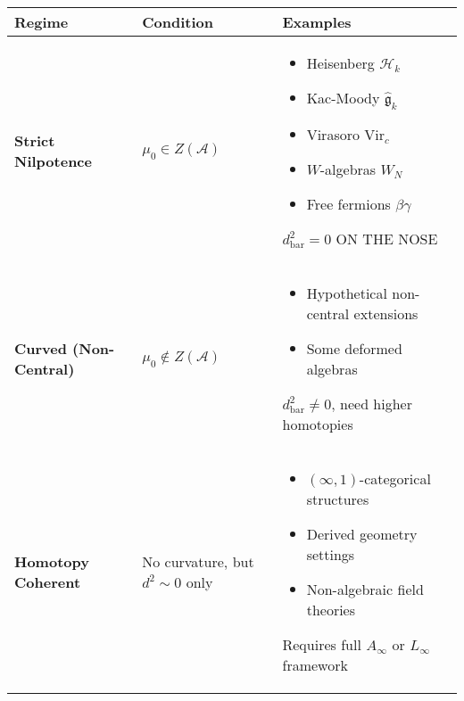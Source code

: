 \begin{center}
\begin{tabular}{|p{3.5cm}|p{4cm}|p{6cm}|}
\hline
\textbf{Regime} & \textbf{Condition} & \textbf{Examples} \\
\hline
\hline
\textbf{Strict Nilpotence} & $\mu_0 \in Z(\mathcal{A})$ & 
\begin{itemize}[leftmargin=*]
\item Heisenberg $\mathcal{H}_k$
\item Kac-Moody $\widehat{\mathfrak{g}}_k$
\item Virasoro $\text{Vir}_c$
\item $W$-algebras $W_N$
\item Free fermions $\beta\gamma$
\end{itemize}
$d_{\text{bar}}^2 = 0$ ON THE NOSE \\
\hline
\textbf{Curved (Non-Central)} & $\mu_0 \notin Z(\mathcal{A})$ & 
\begin{itemize}[leftmargin=*]
\item Hypothetical non-central extensions
\item Some deformed algebras
\end{itemize}
$d_{\text{bar}}^2 \neq 0$, need higher homotopies \\
\hline
\textbf{Homotopy Coherent} & No curvature, but $d^2 \sim 0$ only & 
\begin{itemize}[leftmargin=*]
\item $(\infty,1)$-categorical structures
\item Derived geometry settings
\item Non-algebraic field theories
\end{itemize}
Requires full $A_\infty$ or $L_\infty$ framework \\
\hline
\end{tabular}
\end{center}

